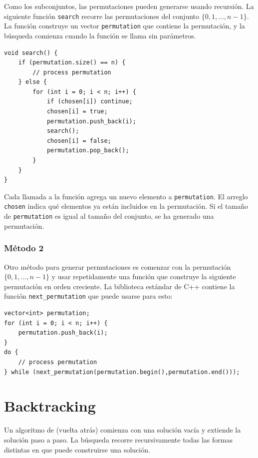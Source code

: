 Como los subconjuntos, las permutaciones pueden generarse
usando recursión.
La siguiente función \texttt{search} recorre
las permutaciones del conjunto $\{0,1,\ldots,n-1\}$.
La función construye un vector \texttt{permutation}
que contiene la permutación,
y la búsqueda comienza cuando la función se
llama sin parámetros.

\begin{lstlisting}
void search() {
    if (permutation.size() == n) {
        // process permutation
    } else {
        for (int i = 0; i < n; i++) {
            if (chosen[i]) continue;
            chosen[i] = true;
            permutation.push_back(i);
            search();
            chosen[i] = false;
            permutation.pop_back();
        }
    }
}
\end{lstlisting}

Cada llamada a la función agrega un nuevo elemento a
\texttt{permutation}.
El arreglo \texttt{chosen} indica qué
elementos ya están incluidos en la permutación.
Si el tamaño de \texttt{permutation} es igual al tamaño del conjunto,
se ha generado una permutación.

\subsubsection{Método 2}


Otro método para generar permutaciones
es comenzar con la permutación
$\{0,1,\ldots,n-1\}$ y usar repetidamente
una función que construye la siguiente permutación
en orden creciente.
La biblioteca estándar de C++ contiene la función
\texttt{next\_permutation} que puede usarse para esto:

\begin{lstlisting}
vector<int> permutation;
for (int i = 0; i < n; i++) {
    permutation.push_back(i);
}
do {
    // process permutation
} while (next_permutation(permutation.begin(),permutation.end()));
\end{lstlisting}

\section{Backtracking}


Un algoritmo de  (vuelta atrás)
comienza con una solución vacía
y extiende la solución paso a paso.
La búsqueda recorre recursivamente
todas las formas distintas en que
puede construirse una solución.

